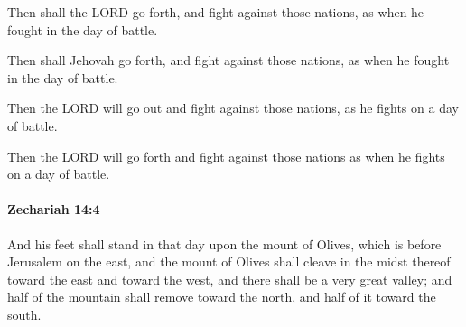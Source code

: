 			Then shall the LORD go forth, and fight against those nations, as when he fought in the day of battle.

			\begin{versebox}
					\item[BHS] 
					\item[LXX] 
					\item[ASV] Then shall Jehovah go forth, and fight against those nations, as when he fought in the day of battle.
					\item[NIV] Then the LORD will go out and fight against those nations, as he fights on a day of battle.
					\item[NRSV] Then the LORD will go forth and fight against those nations as when he fights on a day of battle.
			\end{versebox}

		\paragraph{Zechariah 14:4} %
			\label{ZECHARIAH-14-4}

			And his feet shall stand in that day upon the mount of Olives, which is before Jerusalem on the east, and the mount of Olives shall cleave in the midst thereof toward the east and toward the west, and there shall be a very great valley; and half of the mountain shall remove toward the north, and half of it toward the south.

